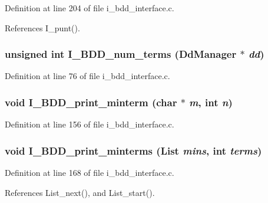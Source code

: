 Definition at line 204 of file i\_\-bdd\_\-interface.c.

References I\_\-punt().
\subsubsection{\setlength{\rightskip}{0pt plus 5cm}unsigned int I\_\-BDD\_\-num\_\-terms (Dd\-Manager $\ast$ {\em dd})}\label{i__bdd__interface_8h_5ee404a84ec9bb9654a15d7ecb4e6284}




Definition at line 76 of file i\_\-bdd\_\-interface.c.
\subsubsection{\setlength{\rightskip}{0pt plus 5cm}void I\_\-BDD\_\-print\_\-minterm (char $\ast$ {\em m}, int {\em n})}\label{i__bdd__interface_8h_95c73f2a41675f4c5b086ff494956fa2}




Definition at line 156 of file i\_\-bdd\_\-interface.c.
\subsubsection{\setlength{\rightskip}{0pt plus 5cm}void I\_\-BDD\_\-print\_\-minterms (\bf{List} {\em mins}, int {\em terms})}\label{i__bdd__interface_8h_95ebeaffd46005bfd656992c81cdf442}




Definition at line 168 of file i\_\-bdd\_\-interface.c.

References List\_\-next(), and List\_\-start().
